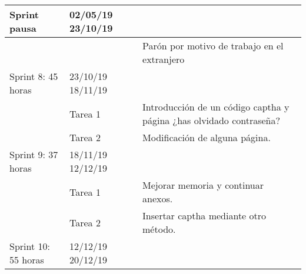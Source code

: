 \begin{table}[H]
\begin{tabular}{|p{1.5cm}|p{1.5cm}|p{5cm}}
Sprint pausa             & 02/05/19 23/10/19                               & \multicolumn{1}{p{9.2cm}|}{}                                                                                             \\ \hline
                         &                               & \multicolumn{1}{p{9.2cm}|}{Parón por motivo de trabajo en el extranjero}                                                                                             \\ \hline
                 
                         
Sprint 8: 45 horas       & 23/10/19 18/11/19           & \multicolumn{1}{l|}{}                                                                                             \\ \hline
                         & Tarea 1                       & \multicolumn{1}{p{9.2cm}|}{Introducción de un código captha y página ¿has olvidado contraseña?}                          \\ \hline
                         & Tarea 2                       & \multicolumn{1}{p{9.2cm}|}{Modificación de alguna página.}                                                               \\ \hline
Sprint 9: 37 horas       & 18/11/19 12/12/19           & \multicolumn{1}{l|}{}                                                                                             \\ \hline
                         & Tarea 1                       & \multicolumn{1}{p{9.2cm}|}{Mejorar memoria y continuar anexos.}                                                 \\ \hline
                         & Tarea 2                       & \multicolumn{1}{p{9.2cm}|}{Insertar captha mediante otro método.}                                               \\ \hline
%
Sprint 10: 55 horas      & 12/12/19 20/12/19         & \multicolumn{1}{l|}{}                                                                                             \\ \hline

\end{tabular}
\end{table}
